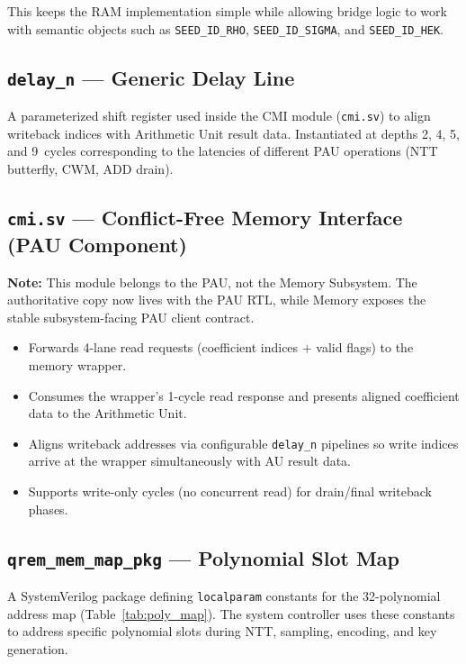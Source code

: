 \documentclass[11pt,letterpaper]{article}
\begin{document}
This keeps the RAM implementation simple while allowing bridge logic to work
with semantic objects such as \texttt{SEED\_ID\_RHO},
\texttt{SEED\_ID\_SIGMA}, and \texttt{SEED\_ID\_HEK}.

\subsection{\texttt{delay\_n} --- Generic Delay Line}

A parameterized shift register used inside the CMI module
(\texttt{cmi.sv}) to align writeback indices with Arithmetic Unit result
data. Instantiated at depths 2, 4, 5, and 9~cycles corresponding to the
latencies of different PAU operations (NTT butterfly, CWM, ADD drain).

\subsection{\texttt{cmi.sv} --- Conflict-Free Memory Interface (PAU
Component)}

\textbf{Note:} This module belongs to the PAU, not the Memory Subsystem.
The authoritative copy now lives with the PAU RTL, while Memory exposes the
stable subsystem-facing PAU client contract.

\begin{itemize}
  \item Forwards 4-lane read requests (coefficient indices $+$ valid
    flags) to the memory wrapper.
  \item Consumes the wrapper's 1-cycle read response and presents aligned
    coefficient data to the Arithmetic Unit.
  \item Aligns writeback addresses via configurable \texttt{delay\_n}
    pipelines so write indices arrive at the wrapper simultaneously with
    AU result data.
  \item Supports write-only cycles (no concurrent read) for drain/final
    writeback phases.
\end{itemize}

\subsection{\texttt{qrem\_mem\_map\_pkg} --- Polynomial Slot Map}

A SystemVerilog package defining \texttt{localparam} constants for the
32-polynomial address map (Table~\ref{tab:poly_map}). The system
controller uses these constants to address specific polynomial slots
during NTT, sampling, encoding, and key generation.
\end{document}
